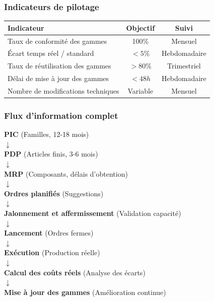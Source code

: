 \documentclass{article}
\begin{document}
\begin{table}[h]
\subsubsection{Indicateurs de pilotage}

\begin{table}[h]
\centering
\begin{tabular}{|l|c|c|}
\hline
\textbf{Indicateur} & \textbf{Objectif} & \textbf{Suivi} \\
\hline
Taux de conformité des gammes & 100\% & Mensuel \\
Écart temps réel / standard & $< 5\%$ & Hebdomadaire \\
Taux de réutilisation des gammes & $> 80\%$ & Trimestriel \\
Délai de mise à jour des gammes & $< 48h$ & Hebdomadaire \\
Nombre de modifications techniques & Variable & Mensuel \\
\hline
\end{tabular}
\end{table}

\subsubsection{Flux d'information complet}

\begin{tcolorbox}[colback=grisclair, colframe=gray!70!black, title=Synthèse du flux de données]
\begin{center}
\textbf{PIC} (Familles, 12-18 mois)\\
$\downarrow$\\
\textbf{PDP} (Articles finis, 3-6 mois)\\
$\downarrow$\\
\textbf{MRP} (Composants, délais d'obtention)\\
$\downarrow$\\
\textbf{Ordres planifiés} (Suggestions)\\
$\downarrow$\\
\textbf{Jalonnement et affermissement} (Validation capacité)\\
$\downarrow$\\
\textbf{Lancement} (Ordres fermes)\\
$\downarrow$\\
\textbf{Exécution} (Production réelle)\\
$\downarrow$\\
\textbf{Calcul des coûts réels} (Analyse des écarts)\\
$\downarrow$\\
\textbf{Mise à jour des gammes} (Amélioration continue)
\end{center}
\end{tcolorbox}


\end{table}
\end{document}

